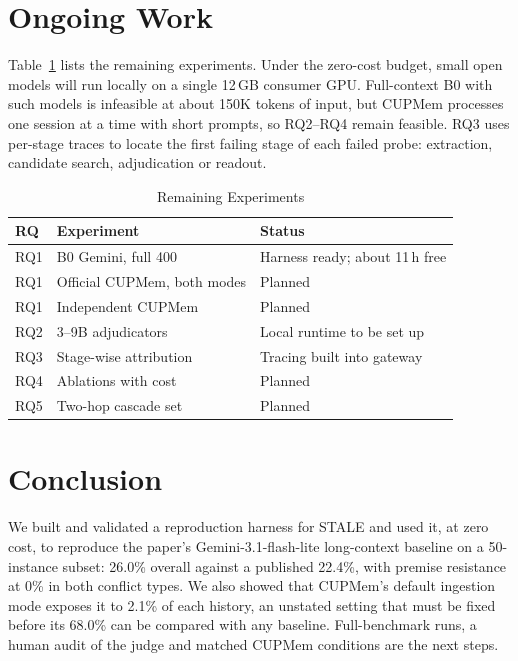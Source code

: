 \documentclass[conference]{IEEEtran}
\begin{document}
\section{Ongoing Work}
Table~\ref{tab:roadmap} lists the remaining experiments. Under the zero-cost budget, small open models will run locally on a single 12\,GB consumer GPU. Full-context B0 with such models is infeasible at about 150K tokens of input, but CUPMem processes one session at a time with short prompts, so RQ2--RQ4 remain feasible. RQ3 uses per-stage traces to locate the first failing stage of each failed probe: extraction, candidate search, adjudication or readout.

\begin{table}[t]
\caption{Remaining Experiments}\label{tab:roadmap}
\centering\footnotesize\setlength{\tabcolsep}{4pt}
\begin{tabular}{@{}lp{}p{}@{}}
\toprule
RQ & Experiment & Status \\
\midrule
RQ1 & B0 Gemini, full 400 & Harness ready; about 11\,h free \\
RQ1 & Official CUPMem, both modes & Planned \\
RQ1 & Independent CUPMem & Planned \\
RQ2 & 3--9B adjudicators & Local runtime to be set up \\
RQ3 & Stage-wise attribution & Tracing built into gateway \\
RQ4 & Ablations with cost & Planned \\
RQ5 & Two-hop cascade set & Planned \\
\bottomrule
\end{tabular}
\end{table}

\section{Conclusion}
We built and validated a reproduction harness for STALE and used it, at zero cost, to reproduce the paper's Gemini-3.1-flash-lite long-context baseline on a 50-instance subset: 26.0\% overall against a published 22.4\%, with premise resistance at 0\% in both conflict types. We also showed that CUPMem's default ingestion mode exposes it to 2.1\% of each history, an unstated setting that must be fixed before its 68.0\% can be compared with any baseline. Full-benchmark runs, a human audit of the judge and matched CUPMem conditions are the next steps.
\end{document}
